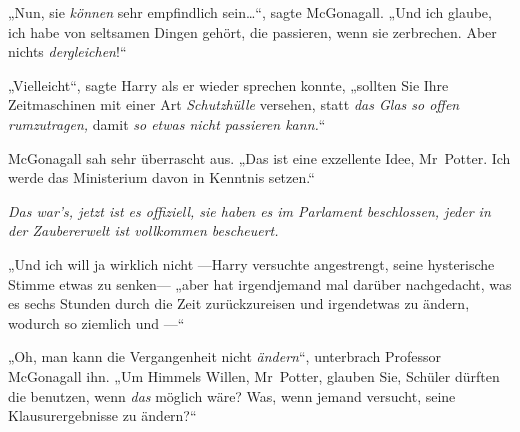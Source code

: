 „Nun, sie \emph{können} sehr empfindlich sein…“, sagte McGonagall. „Und ich glaube, ich habe von seltsamen Dingen gehört, die passieren, wenn sie zerbrechen. Aber nichts \emph{dergleichen}!“

„Vielleicht“, sagte Harry als er wieder sprechen konnte, „sollten Sie Ihre Zeitmaschinen mit einer Art \emph{Schutzhülle} versehen, statt \emph{das Glas so offen rumzutragen,} damit \emph{so etwas nicht passieren kann.}“

McGonagall sah sehr überrascht aus. „Das ist eine exzellente Idee, Mr~Potter. Ich werde das Ministerium davon in Kenntnis setzen.“

\emph{Das war’s, jetzt ist es offiziell, sie haben es im Parlament beschlossen, jeder in der Zaubererwelt ist vollkommen bescheuert.}

„Und ich will ja wirklich nicht —Harry versuchte angestrengt, seine hysterische Stimme etwas zu senken— „aber hat irgendjemand mal darüber nachgedacht, was es  sechs Stunden durch die Zeit zurückzureisen und irgendetwas zu ändern, wodurch so ziemlich  und —“

„Oh, man kann die Vergangenheit nicht \emph{ändern}“, unterbrach Professor McGonagall ihn. „Um Himmels Willen, Mr~Potter, glauben Sie, Schüler dürften die benutzen, wenn \emph{das} möglich wäre? Was, wenn jemand versucht, seine Klausurergebnisse zu ändern?“

